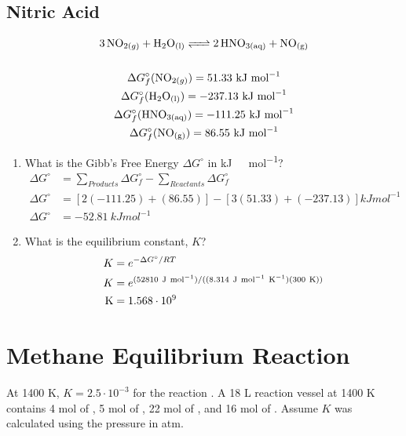 \documentclass{article}
\begin{document}
\subsection{Nitric Acid}
\begin{gather*}
    \ce{3NO_{2(g)} + H_{2}O_{(l)} <=> 2HNO_{3(aq)} + NO_{(g)}}\\\\
    \Delta G^{\circ}_{f}(\ce{NO_{2(g)}}) = 51.33\ \si{kJ\ mol^{-1}}\\
    \Delta G^{\circ}_{f}(\ce{H_{2}O_{(l)}}) = -237.13\ \si{kJ\ mol^{-1}}\\
    \Delta G^{\circ}_{f}(\ce{HNO_{3(aq)}}) = -111.25\ \si{kJ\ mol^{-1}}\\
    \Delta G^{\circ}_{f}(\ce{NO_{(g)}}) = 86.55\ \si{kJ\ mol^{-1}}
\end{gather*}

\begin{enumerate}
    \item What is the Gibb's Free Energy $\Delta G^{\circ}$ in \si{kJ\ mol^{-1}}?
    \begin{align*}
        \Delta G^{\circ}&=\sum\limits_{Products}\Delta G^{\circ}_{f} - \sum\limits_{Reactants} \Delta G^{\circ}_{f}\\
        \Delta G^{\circ}&=\left[2(-111.25)+(86.55)\right]- \left[3(51.33)+(-237.13)\right]\si{kJ mol^{-1}}\\
        \Delta G^{\circ}&=-52.81\ \si{kJ mol^{-1}}
    \end{align*}
    \item What is the equilibrium constant, $K$?
    \begin{align*}
        K &= e^{-\Delta G^{\circ}/RT}\\
        K &= e^{(52810\ \si{J\ mol^{-1}})/((8.314\ \si{J\ mol^{-1}\ K^{-1}})(300\ \si{K}))}\\
        \ce{K} &= 1.568\cdot 10^{9}
    \end{align*}
\end{enumerate}

\section{Methane Equilibrium Reaction}

At 1400 \si{K}, $K= 2.5\cdot10^{-3}$ for the reaction . A 18 \si{L} reaction vessel at 1400 \si{K} contains 4 \si{mol} of , 5 \si{mol} of , 22 \si{mol} of , and 16 \si{mol} of . Assume $K$ was calculated using the pressure in \si{atm}.
\end{document}
